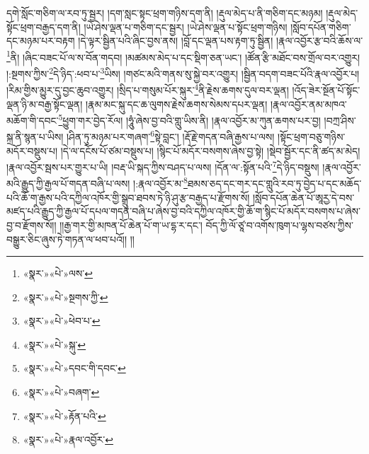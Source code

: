 དགེ་སློང་གཅིག་ལ་རབ་ཏུ་སྦྱར། །དག་སླང་སྟང་ཕྲག་གཉིས་དག་ནི། །རྡུལ་མེད་པ་ནི་གཅིག་དང་མཉམ། །རྡུལ་མེད་སྟོང་ཕྲག་བརྒྱད་དག་ནི། །ཡེ་ཤེས་ལྡན་པ་གཅིག་དང་སྦྱར། །ཡེ་ཤེས་ལྡན་པ་སྟོང་ཕྲག་གཉིས། །སློབ་དཔོན་གཅིག་དང་མཉམ་པར་བརྟག །དེ་ལྟར་སྦྱིན་པའི་ཞིང་བྱས་ནས། །བློ་དང་ལྡན་པས་རྟག་ཏུ་སྦྱིན། །རྣལ་འབྱོར་རྩ་བའི་ཆོས་ལ་\footnote{«སྣར་»«པེ་»ལས་}ནི། །ཞིང་བཟང་པོ་ལ་ས་བོན་གདབ། །མཚམས་མེད་པ་དང་སྡིག་ཅན་ཡང་། །ཚོན་རྩི་མཐོང་བས་གྲོལ་བར་འགྱུར། །:སྔགས་ཀྱིས་\footnote{«སྣར་»«པེ་»སྔགས་ཀྱི་}དེ་ཉིད་:ཕབ་པ་\footnote{«སྣར་»«པེ་»ཕེབ་པ་}ཡིས། །གཙང་མའི་གནས་སུ་སྐྱེ་བར་འགྱུར། །སྦྱིན་བདག་བཟང་པོའི་རྣལ་འབྱོར་པ། །རིམ་གྱིས་མྱུར་དུ་བྱང་ཆུབ་འགྱུར། །སྲིད་པ་གསུམ་པོར་སྐུར་\footnote{«སྣར་»«པེ་»སྐུ་}ནི་རྗེས་ཆགས་དུལ་བར་ལྡན། །འོད་ཟེར་སྔོན་པོ་སྟོང་ལྡན་ཉི་མ་བརྒྱ་སྟོང་ལྡན། །རྣམ་མང་སྐུ་དང་ཆ་ལུགས་རྗེས་ཆགས་སེམས་དཔར་ལྡན། །རྣལ་འབྱོར་ནམ་མཁའ་མཆོག་གི་དབང་\footnote{«སྣར་»«པེ་»དབང་གི་དབང་}ཕྱུག་གར་བྱེད་རོལ། །ཧཱུཾ་ཞེས་བྱ་བའི་གླུ་ཡིས་ནི། །རྣལ་འབྱོར་མ་ཀུན་ཆགས་པར་བྱ། །བཀྲ་ཤིས་སྐྲ་ནི་སྙན་པ་ཡིས། །ཤིན་ཏུ་མཉམ་པར་གཞག་\footnote{«སྣར་»«པེ་»བཞག་}སྟེ་བླང་། །རྡོ་རྗེ་གདན་བཞི་རྒྱས་པ་ལས། །སྟོང་ཕྲག་བཅུ་གཉིས་མདོར་བསྡུས་པ། །དེ་ལ་དངོས་པོ་ཙམ་བསྡུས་པ། །སྙིང་པོ་མདོར་བསགས་ཞེས་བྱ་སྟེ། །སྡེབ་སྦྱོར་དང་ནི་ཚད་མ་མེད། །རྣལ་འབྱོར་སྦས་པར་གྱུར་པ་ཡི། །བརྡ་ཡི་སྐད་ཀྱིས་བཤད་པ་ལས། །དོན་ལ་:སྟོན་པའི་\footnote{«སྣར་»«པེ་»རྟོན་པའི་}དེ་ཉིད་བསྡུས། །རྣལ་འབྱོར་མའི་རྒྱུད་ཀྱི་རྒྱལ་པོ་གདན་བཞི་པ་ལས། །:རྣལ་འབྱོར་མ་\footnote{«སྣར་»«པེ་»རྣལ་འབྱོར་}ཐམས་ཅད་དང་གར་དང་གླུའི་རབ་ཏུ་བྱེད་པ་དང་མཆོད་པའི་ཆོ་ག་རྒྱས་པའི་དཀྱིལ་འཁོར་གྱི་སྒྲུབ་ཐབས་ཏེ་ཉི་ཤུ་རྩ་བརྒྱད་པ་རྫོགས་སོ། །སློབ་དཔོན་ཆེན་པོ་ཨཱརྱ་དེ་བས་མཛད་པའི་རྒྱུད་ཀྱི་རྒྱལ་པོ་དཔལ་གདན་བཞི་པ་ཞེས་བྱ་བའི་དཀྱིལ་འཁོར་གྱི་ཆོ་ག་སྙིང་པོ་མདོར་བསགས་པ་ཞེས་བྱ་བ་རྫོགས་སོ།། །།རྒྱ་གར་གྱི་མཁན་པོ་ཆེན་པོ་ག་ཡ་དྷ་ར་དང་། བོད་ཀྱི་ལོ་ཙཱ་བ་འགོས་ཁུག་པ་ལྷས་བཙས་ཀྱིས་བསྒྱུར་ཅིང་ཞུས་ཏེ་གཏན་ལ་ཕབ་པའོ།། །།